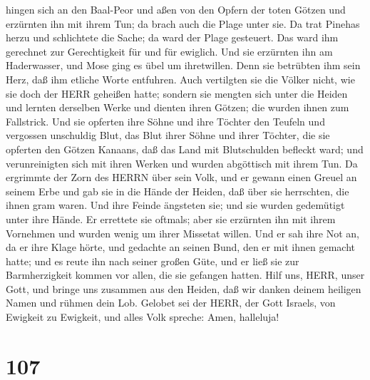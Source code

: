 hingen sich an den Baal-Peor und aßen von den Opfern der toten Götzen
 und erzürnten ihn mit ihrem Tun; da brach auch die Plage
unter sie.  Da trat Pinehas herzu und schlichtete die
Sache; da ward der Plage gesteuert.  Das ward ihm gerechnet
zur Gerechtigkeit für und für ewiglich.  Und sie erzürnten
ihn am Haderwasser, und Mose ging es übel um ihretwillen. 
Denn sie betrübten ihm sein Herz, daß ihm etliche Worte entfuhren.
 Auch vertilgten sie die Völker nicht, wie sie doch der
HERR geheißen hatte;  sondern sie mengten sich unter die
Heiden und lernten derselben Werke  und dienten ihren
Götzen; die wurden ihnen zum Fallstrick.  Und sie opferten
ihre Söhne und ihre Töchter den Teufeln  und vergossen
unschuldig Blut, das Blut ihrer Söhne und ihrer Töchter, die sie
opferten den Götzen Kanaans, daß das Land mit Blutschulden befleckt
ward;  und verunreinigten sich mit ihren Werken und wurden
abgöttisch mit ihrem Tun.  Da ergrimmte der Zorn des HERRN
über sein Volk, und er gewann einen Greuel an seinem Erbe 
und gab sie in die Hände der Heiden, daß über sie herrschten, die ihnen
gram waren.  Und ihre Feinde ängsteten sie; und sie wurden
gedemütigt unter ihre Hände.  Er errettete sie oftmals;
aber sie erzürnten ihn mit ihrem Vornehmen und wurden wenig um ihrer
Missetat willen.  Und er sah ihre Not an, da er ihre Klage
hörte,  und gedachte an seinen Bund, den er mit ihnen
gemacht hatte; und es reute ihn nach seiner großen Güte, 
und er ließ sie zur Barmherzigkeit kommen vor allen, die sie gefangen
hatten.  Hilf uns, HERR, unser Gott, und bringe uns
zusammen aus den Heiden, daß wir danken deinem heiligen Namen und rühmen
dein Lob.  Gelobet sei der HERR, der Gott Israels, von
Ewigkeit zu Ewigkeit, und alles Volk spreche: Amen, halleluja!

\hypertarget{section-106}{%
\section{107}\label{section-106}}


